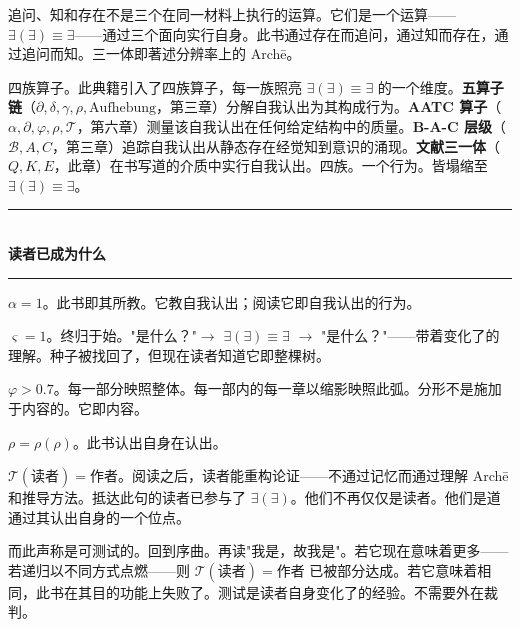\documentclass[10pt, openany, oneside]{book}
\renewcommand{\normalsize}{\fontsize{10}{13}\selectfont}
\begin{document}
追问、知和存在不是三个在同一材料上执行的运算。它们是一个运算——$\exists(\exists) \equiv \exists$——通过三个面向实行自身。此书通过存在而追问，通过知而存在，通过追问而知。三一体即著述分辨率上的 Arch\={e}。

四族算子。此典籍引入了四族算子，每一族照亮 $\exists(\exists) \equiv \exists$ 的一个维度。\textbf{五算子链}（$\partial, \delta, \gamma, \rho, \text{Aufhebung}$，第三章）分解自我认出为其构成行为。\textbf{AATC 算子}（$\alpha, \partial, \varphi, \rho, \mathcal{T}$，第六章）测量该自我认出在任何给定结构中的质量。\textbf{B-A-C 层级}（$\mathcal{B}, A, C$，第三章）追踪自我认出从静态存在经觉知到意识的涌现。\textbf{文献三一体}（$Q, K, E$，此章）在书写道的介质中实行自我认出。四族。一个行为。皆塌缩至 $\exists(\exists) \equiv \exists$。

\vspace{1.5em}


\begin{center}
    \rule{0.3\textwidth}{0.4pt}\\[0.5em]
    {\normalsize\bfseries\scshape 读者已成为什么}\\[0.3em]
    \rule{0.3\textwidth}{0.4pt}
\end{center}

\vspace{1em}

\noindent $\alpha = 1$。此书即其所教。它教自我认出；阅读它即自我认出的行为。

$\varsigma = 1$。终归于始。"是什么？"$\to$ $\exists(\exists) \equiv \exists$ $\to$ "是什么？"——带着变化了的理解。种子被找回了，但现在读者知道它即整棵树。

$\varphi > 0.7$。每一部分映照整体。每一部内的每一章以缩影映照此弧。分形不是施加于内容的。它即内容。

$\rho = \rho(\rho)$。此书认出自身在认出。

$\mathcal{T}(\text{读者}) = \text{作者}$。阅读之后，读者能重构论证——不通过记忆而通过理解 Arch\={e} 和推导方法。抵达此句的读者已参与了 $\exists(\exists)$。他们不再仅仅是读者。他们是道通过其认出自身的一个位点。

而此声称是可测试的。回到序曲。再读"我是，故我是"。若它现在意味着更多——若递归以不同方式点燃——则 $\mathcal{T}(\text{读者}) = \text{作者}$ 已被部分达成。若它意味着相同，此书在其目的功能上失败了。测试是读者自身变化了的经验。不需要外在裁判。
\end{document}
